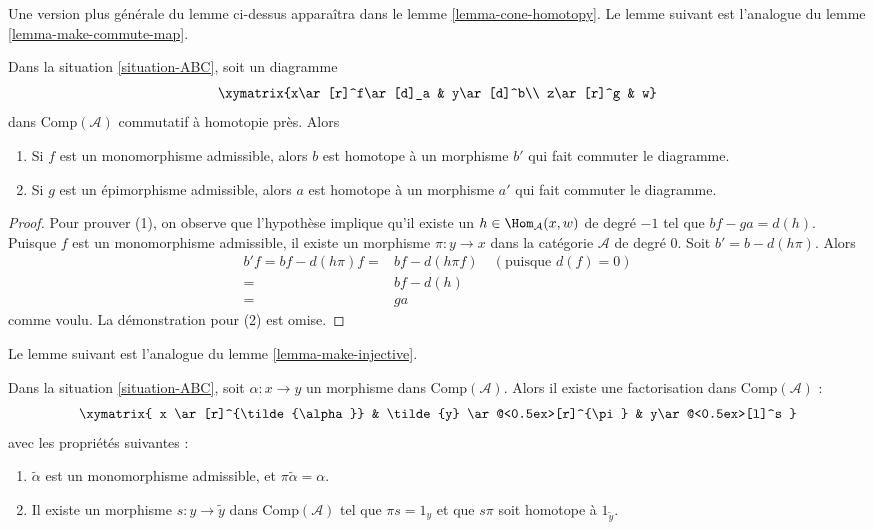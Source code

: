 \noindent
Une version plus générale du lemme ci-dessus apparaîtra
dans le lemme \ref{lemma-cone-homotopy}. Le lemme suivant est
l'analogue du lemme \ref{lemma-make-commute-map}.

\begin{lemma}
\label{lemma-homo-change}
Dans la situation \ref{situation-ABC}, soit un diagramme
$$
\xymatrix{x\ar[r]^f\ar[d]_a & y\ar[d]^b\\
z\ar[r]^g & w}
$$
dans $\text{Comp}(\mathcal{A})$ commutatif à homotopie près. Alors
\begin{enumerate}
\item Si $f$ est un monomorphisme admissible, alors $b$ est
homotope à un morphisme $b'$ qui fait commuter le diagramme.
\item Si $g$ est un épimorphisme admissible, alors $a$ est
homotope à un morphisme $a'$ qui fait commuter le diagramme.
\end{enumerate}
\end{lemma}

\begin{proof}
Pour prouver (1), on observe que l'hypothèse implique qu'il existe un
$h\in\Hom_{\mathcal{A}}(x,w)$ de degré $-1$ tel que $bf-ga=d(h)$.
Puisque $f$ est un monomorphisme admissible, il existe un morphisme
$\pi : y \to x$ dans la catégorie $\mathcal{A}$ de degré $0$.
Soit $b' = b - d(h\pi)$. Alors
\begin{align*}
b'f = bf - d(h\pi)f
= &
bf - d(h\pi f) \quad (\text{puisque }d(f) = 0) \\ = &
bf-d(h)
\\ =
&
ga
\end{align*}
comme voulu. La démonstration pour (2) est omise.
\end{proof}

\noindent
Le lemme suivant est l'analogue du lemme \ref{lemma-make-injective}.

\begin{lemma}
\label{lemma-factor}
Dans la situation \ref{situation-ABC}, soit $\alpha : x \to
y$ un morphisme dans $\text{Comp}(\mathcal{A})$. Alors il existe
une factorisation dans $\text{Comp}(\mathcal{A})$ :
$$
\xymatrix{
x \ar[r]^{\tilde{\alpha}} &
\tilde{y} \ar@<0.5ex>[r]^{\pi} &
y\ar@<0.5ex>[l]^s
}
$$
avec les propriétés suivantes :
\begin{enumerate}
\item $\tilde{\alpha}$ est un monomorphisme admissible, et
$\pi\tilde{\alpha}=\alpha$.
\item Il existe un morphisme
$s:y\to\tilde{y}$ dans $\text{Comp}(\mathcal{A})$
tel que $\pi s=1_y$ et que $s\pi$ soit homotope à $1_{\tilde{y}}$.
\end{enumerate}
\end{lemma}

